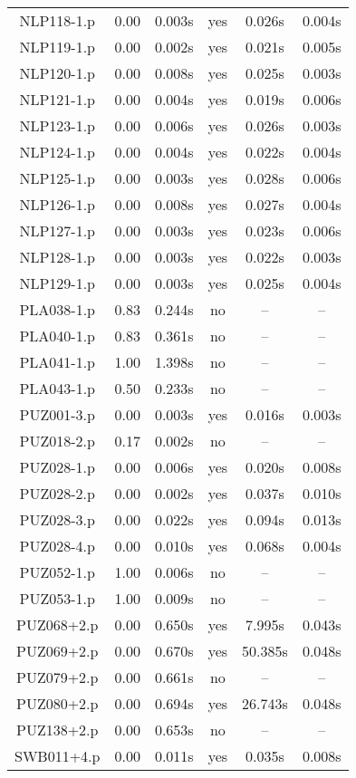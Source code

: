 \begin{longtable}{||c | c | c | c | c | c||}
NLP118-1.p & 0.00 & 0.003s & yes & 0.026s & 0.004s \\
NLP119-1.p & 0.00 & 0.002s & yes & 0.021s & 0.005s \\
NLP120-1.p & 0.00 & 0.008s & yes & 0.025s & 0.003s \\
NLP121-1.p & 0.00 & 0.004s & yes & 0.019s & 0.006s \\
NLP123-1.p & 0.00 & 0.006s & yes & 0.026s & 0.003s \\
NLP124-1.p & 0.00 & 0.004s & yes & 0.022s & 0.004s \\
NLP125-1.p & 0.00 & 0.003s & yes & 0.028s & 0.006s \\
NLP126-1.p & 0.00 & 0.008s & yes & 0.027s & 0.004s \\
NLP127-1.p & 0.00 & 0.003s & yes & 0.023s & 0.006s \\
NLP128-1.p & 0.00 & 0.003s & yes & 0.022s & 0.003s \\
NLP129-1.p & 0.00 & 0.003s & yes & 0.025s & 0.004s \\
PLA038-1.p & 0.83 & 0.244s & no & -- & -- \\
PLA040-1.p & 0.83 & 0.361s & no & -- & -- \\
PLA041-1.p & 1.00 & 1.398s & no & -- & -- \\
PLA043-1.p & 0.50 & 0.233s & no & -- & -- \\
PUZ001-3.p & 0.00 & 0.003s & yes & 0.016s & 0.003s \\
PUZ018-2.p & 0.17 & 0.002s & no & -- & -- \\
PUZ028-1.p & 0.00 & 0.006s & yes & 0.020s & 0.008s \\
PUZ028-2.p & 0.00 & 0.002s & yes & 0.037s & 0.010s \\
PUZ028-3.p & 0.00 & 0.022s & yes & 0.094s & 0.013s \\
PUZ028-4.p & 0.00 & 0.010s & yes & 0.068s & 0.004s \\
PUZ052-1.p & 1.00 & 0.006s & no & -- & -- \\
PUZ053-1.p & 1.00 & 0.009s & no & -- & -- \\
PUZ068+2.p & 0.00 & 0.650s & yes & 7.995s & 0.043s \\
PUZ069+2.p & 0.00 & 0.670s & yes & 50.385s & 0.048s \\
PUZ079+2.p & 0.00 & 0.661s & no & -- & -- \\
PUZ080+2.p & 0.00 & 0.694s & yes & 26.743s & 0.048s \\
PUZ138+2.p & 0.00 & 0.653s & no & -- & -- \\
SWB011+4.p & 0.00 & 0.011s & yes & 0.035s & 0.008s \\

\end{longtable}
